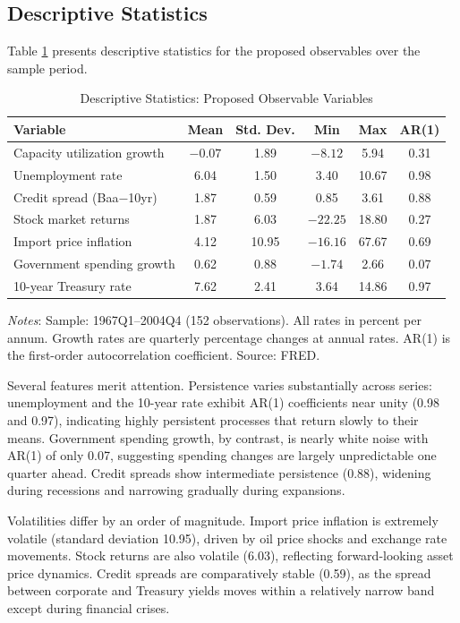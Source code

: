 \documentclass[12pt]{article}
\begin{document}
\subsection{Descriptive Statistics}

Table \ref{tab:stats} presents descriptive statistics for the proposed observables over the sample period.

\begin{table}[H]
\centering
\caption{Descriptive Statistics: Proposed Observable Variables}
\label{tab:stats}
\begin{tabular}{lccccc}
\toprule
Variable & Mean & Std. Dev. & Min & Max & AR(1) \\
\midrule
Capacity utilization growth & $-0.07$ & 1.89 & $-8.12$ & 5.94 & 0.31 \\
Unemployment rate & 6.04 & 1.50 & 3.40 & 10.67 & 0.98 \\
Credit spread (Baa$-$10yr) & 1.87 & 0.59 & 0.85 & 3.61 & 0.88 \\
Stock market returns & 1.87 & 6.03 & $-22.25$ & 18.80 & 0.27 \\
Import price inflation & 4.12 & 10.95 & $-16.16$ & 67.67 & 0.69 \\
Government spending growth & 0.62 & 0.88 & $-1.74$ & 2.66 & 0.07 \\
10-year Treasury rate & 7.62 & 2.41 & 3.64 & 14.86 & 0.97 \\
\bottomrule
\end{tabular}
\begin{flushleft}
\small \textit{Notes}: Sample: 1967Q1--2004Q4 (152 observations). All rates in percent per annum. Growth rates are quarterly percentage changes at annual rates. AR(1) is the first-order autocorrelation coefficient. Source: FRED.
\end{flushleft}
\end{table}

Several features merit attention. Persistence varies substantially across series: unemployment and the 10-year rate exhibit AR(1) coefficients near unity (0.98 and 0.97), indicating highly persistent processes that return slowly to their means. Government spending growth, by contrast, is nearly white noise with AR(1) of only 0.07, suggesting spending changes are largely unpredictable one quarter ahead. Credit spreads show intermediate persistence (0.88), widening during recessions and narrowing gradually during expansions.

Volatilities differ by an order of magnitude. Import price inflation is extremely volatile (standard deviation 10.95), driven by oil price shocks and exchange rate movements. Stock returns are also volatile (6.03), reflecting forward-looking asset price dynamics. Credit spreads are comparatively stable (0.59), as the spread between corporate and Treasury yields moves within a relatively narrow band except during financial crises.
\end{document}
